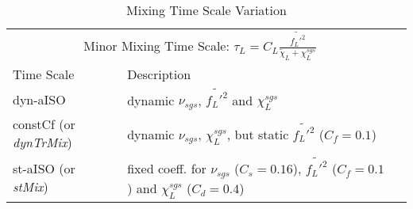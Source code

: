 \begin{table}[hbt]
    \caption{Mixing Time Scale Variation}
    \centering
    \begin{tabular}{llr}
        \toprule
        \multicolumn{2}{c}{Minor Mixing Time Scale: $\tau_L = C_{L} \frac{\widetilde{f_L'^2} }{\tilde{\chi}_L + \chi^{sgs}_L}$} \\
        \cmidrule(r){1-2}
        Time Scale & Description \\
        \midrule
        dyn-aISO & dynamic $\nu_{sgs}$, $\widetilde{f_L'^2}$ and $\chi^{sgs}_L$ \\
        constCf (or \textit{dynTrMix}) & dynamic $\nu_{sgs}$, $\chi^{sgs}_L$, but static $\widetilde{f_L'^2}$ ($C_f=0.1$) \\
        st-aISO (or \textit{stMix}) & fixed coeff. for $\nu_{sgs}$ ($C_s=0.16$), $\widetilde{f_L'^2}$ ($C_f=0.1$) and $\chi^{sgs}_L$ ($C_d=0.4$) \\
        \bottomrule
    \end{tabular}
    \label{tab:label}
\end{table}